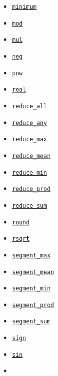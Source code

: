 \begin{itemize}
\item
  \href{../../api_docs/python/math_ops.md\#minimum}{\texttt{minimum}}
\item
  \href{../../api_docs/python/math_ops.md\#mod}{\texttt{mod}}
\item
  \href{../../api_docs/python/math_ops.md\#mul}{\texttt{mul}}
\item
  \href{../../api_docs/python/math_ops.md\#neg}{\texttt{neg}}
\item
  \href{../../api_docs/python/math_ops.md\#pow}{\texttt{pow}}
\item
  \href{../../api_docs/python/math_ops.md\#real}{\texttt{real}}
\item
  \href{../../api_docs/python/math_ops.md\#reduce_all}{\texttt{reduce\_all}}
\item
  \href{../../api_docs/python/math_ops.md\#reduce_any}{\texttt{reduce\_any}}
\item
  \href{../../api_docs/python/math_ops.md\#reduce_max}{\texttt{reduce\_max}}
\item
  \href{../../api_docs/python/math_ops.md\#reduce_mean}{\texttt{reduce\_mean}}
\item
  \href{../../api_docs/python/math_ops.md\#reduce_min}{\texttt{reduce\_min}}
\item
  \href{../../api_docs/python/math_ops.md\#reduce_prod}{\texttt{reduce\_prod}}
\item
  \href{../../api_docs/python/math_ops.md\#reduce_sum}{\texttt{reduce\_sum}}
\item
  \href{../../api_docs/python/math_ops.md\#round}{\texttt{round}}
\item
  \href{../../api_docs/python/math_ops.md\#rsqrt}{\texttt{rsqrt}}
\item
  \href{../../api_docs/python/math_ops.md\#segment_max}{\texttt{segment\_max}}
\item
  \href{../../api_docs/python/math_ops.md\#segment_mean}{\texttt{segment\_mean}}
\item
  \href{../../api_docs/python/math_ops.md\#segment_min}{\texttt{segment\_min}}
\item
  \href{../../api_docs/python/math_ops.md\#segment_prod}{\texttt{segment\_prod}}
\item
  \href{../../api_docs/python/math_ops.md\#segment_sum}{\texttt{segment\_sum}}
\item
  \href{../../api_docs/python/math_ops.md\#sign}{\texttt{sign}}
\item
  \href{../../api_docs/python/math_ops.md\#sin}{\texttt{sin}}
\item

\end{itemize}
